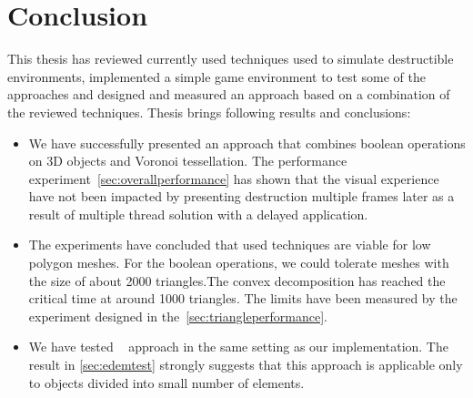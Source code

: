 \chapter*{Conclusion}

This thesis has reviewed currently used techniques used to simulate destructible environments, implemented a simple game environment to test some of the approaches and designed and measured an approach based on a combination of the reviewed techniques. Thesis brings following results and conclusions:

\begin{itemize}
\item We have successfully presented an approach that combines boolean operations on 3D objects and Voronoi tessellation. The performance experiment~\cref{sec:overallperformance} has shown that the visual experience have not been impacted by presenting destruction multiple frames later as a result of multiple thread solution with a delayed application.

\item The experiments have concluded that used techniques are viable for low polygon meshes. For the boolean operations, we could tolerate meshes with the size of about 2000 triangles.The convex decomposition has reached the critical time at around 1000 triangles. The limits have been measured by the experiment designed in the~\cref{sec:triangleperformance}.

\item We have tested ~\citet{edem} approach in the same setting as our implementation. The result in \cref{sec:edemtest} strongly suggests that this approach is applicable only to objects divided into small number of elements.
\end{itemize}


